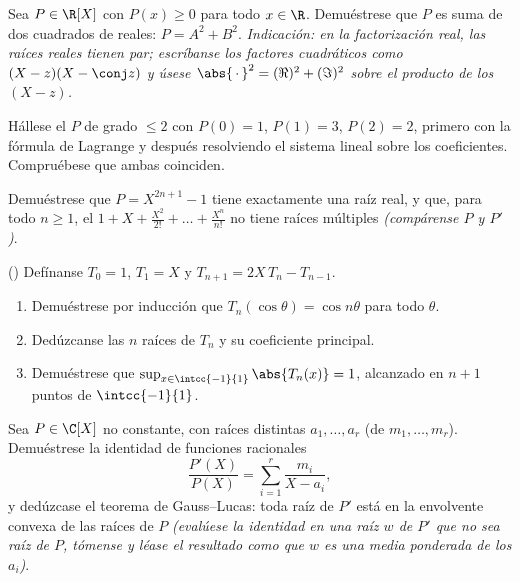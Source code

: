 \begin{exercise}[$\star\star$]\label{exo:b1:poly:7}
Sea $P \in \R[X]$ con $P(x) \geq 0$ para todo $x \in \R$. Demuéstrese
que $P$ es suma de dos cuadrados de  reales:
$P = A^2 + B^2$. \emph{Indicación: en la factorización real, las raíces
reales tienen  par; escríbanse los factores cuadráticos
como $(X - z)(X - \conj z)$ y úsese $\abs{\,\cdot\,}^2 = (\Re)^2 +
(\Im)^2$ sobre el producto de los $(X - z)$.}
\end{exercise}

\begin{exercise}[$\star\star$]\label{exo:b1:poly:8}
Hállese el  $P$ de grado $\leq 2$ con $P(0) = 1$, $P(1) = 3$,
$P(2) = 2$, primero con la fórmula de Lagrange y después resolviendo el
sistema lineal sobre los coeficientes. Compruébese que ambas coinciden.
\end{exercise}

\begin{exercise}[$\star\star$]\label{exo:b1:poly:9}
Demuéstrese que $P = X^{2n+1} - 1$ tiene exactamente una raíz real, y
que, para todo $n \geq 1$, el  $1 + X + \frac{X^2}{2!} +
\dots + \frac{X^n}{n!}$ no tiene raíces múltiples \emph{(compárense $P$
y $P'$)}.
\end{exercise}

\begin{exercise}[$\star\star\star$]\label{exo:b1:poly:10}
() Defínanse $T_0 = 1$, $T_1 = X$ y
$T_{n+1} = 2X\,T_n - T_{n-1}$.
\begin{enumerate}
  \item Demuéstrese por inducción que $T_n(\cos\theta) = \cos n\theta$
        para todo $\theta$.
  \item Dedúzcanse las $n$ raíces de $T_n$ y su coeficiente principal.
  \item Demuéstrese que $\sup_{x \in \intcc{-1}{1}} \abs{T_n(x)} = 1$,
        alcanzado en $n + 1$ puntos de $\intcc{-1}{1}$.
\end{enumerate}
\end{exercise}

\begin{exercise}[$\star\star\star$]\label{exo:b1:poly:11}
Sea $P \in \C[X]$ no constante, con raíces distintas $a_1, \dots, a_r$
(de  $m_1, \dots, m_r$). Demuéstrese la identidad de
funciones racionales
\[
\frac{P'(X)}{P(X)} = \sum_{i=1}^{r} \frac{m_i}{X - a_i},
\]
y dedúzcase el teorema de Gauss--Lucas: toda raíz de $P'$ está en la
envolvente convexa de las raíces de $P$ \emph{(evalúese la identidad en
una raíz $w$ de $P'$ que no sea raíz de $P$, tómense  y léase
el resultado como que $w$ es una media ponderada de los $a_i$)}.
\end{exercise}

